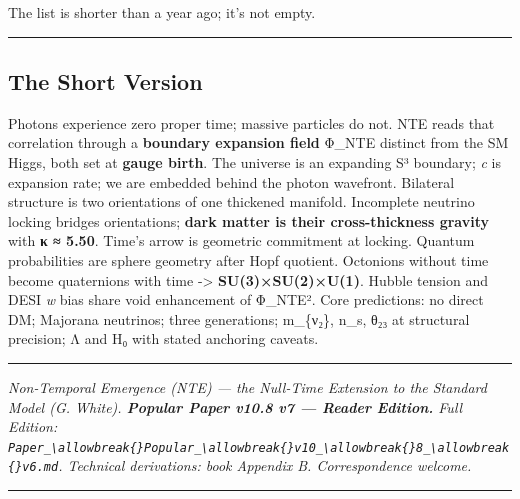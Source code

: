 \documentclass[
  11pt,
]{article}
\begin{document}
The list is shorter than a year ago; it's not empty.

\begin{center}\rule{0.5\linewidth}{0.5pt}\end{center}

\subsection{The Short Version}\label{the-short-version}

Photons experience zero proper time; massive particles do not. NTE reads
that correlation through a \textbf{boundary expansion field}
\textbar Φ\_NTE\textbar{} distinct from the SM Higgs, both set at
\textbf{gauge birth}. The universe is an expanding S³ boundary; \emph{c}
is expansion rate; we are embedded behind the photon wavefront.
Bilateral structure is two orientations of one thickened manifold.
Incomplete neutrino locking bridges orientations; \textbf{dark matter is
their cross-thickness gravity} with \textbf{κ ≈ 5.50}. Time's arrow is
geometric commitment at locking. Quantum probabilities are sphere
geometry after Hopf quotient. Octonions without time become quaternions
with time -\textgreater{} \textbf{SU(3)×SU(2)×U(1)}. Hubble tension and
DESI \emph{w} bias share void enhancement of \textbar Φ\_NTE\textbar².
Core predictions: no direct DM; Majorana neutrinos; three generations;
m\_\{ν₂\}, n\_s, θ₂₃ at structural precision; Λ and H₀ with stated
anchoring caveats.

\begin{center}\rule{0.5\linewidth}{0.5pt}\end{center}

\emph{Non-Temporal Emergence (NTE) --- the Null-Time Extension to the
Standard Model (G. White). \textbf{Popular Paper v10.8 v7 --- Reader
Edition.} Full Edition:
\texttt{Paper\_\textbackslash{}allowbreak\{\}Popular\_\textbackslash{}allowbreak\{\}v10\_\textbackslash{}allowbreak\{\}8\_\textbackslash{}allowbreak\{\}v6.md}.
Technical derivations: book Appendix B. Correspondence welcome.}

\begin{center}\rule{0.5\linewidth}{0.5pt}\end{center}
\end{document}
